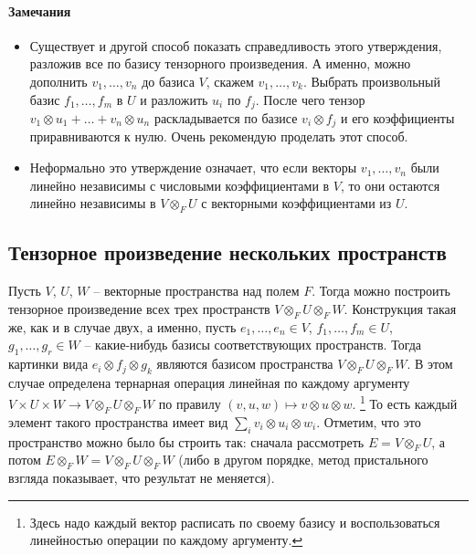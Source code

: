 \paragraph{Замечания}

\begin{itemize}
\item Существует и другой способ показать справедливость этого утверждения, разложив все по базису тензорного произведения.
А именно, можно дополнить $v_1,\ldots,v_n$ до базиса $V$, скажем $v_1,\ldots, v_k$.
Выбрать произвольный базис $f_1,\ldots,f_m$ в $U$ и разложить $u_i$ по $f_j$.
После чего тензор $v_1\otimes u_1 + \ldots + v_n\otimes u_n$ раскладывается по базисе $v_i\otimes f_j$ и его коэффициенты приравниваются к нулю.
Очень рекомендую проделать этот способ.

\item Неформально это утверждение означает, что если векторы $v_1,\ldots,v_n$ были линейно независимы с числовыми коэффициентами в $V$, то они остаются линейно независимы в $V\otimes_F U$ с векторными коэффициентами из $U$.
\end{itemize}


\subsection*{Тензорное произведение нескольких пространств}

Пусть $V$, $U$, $W$ -- векторные пространства над полем $F$.
Тогда можно построить тензорное произведение всех трех пространств $V\otimes_F U\otimes_F W$.
Конструкция такая же, как и в случае двух, а именно, пусть $e_1,\ldots,e_n\in V$, $f_1,\ldots,f_m\in U$, $g_1,\ldots, g_r\in W$ -- какие-нибудь базисы соответствующих пространств.
Тогда картинки вида $e_i\otimes f_j\otimes g_k$ являются базисом пространства $V\otimes_F U\otimes_F W$.
В этом случае определена тернарная операция линейная по каждому аргументу $V\times U\times W\to V\otimes_F U\otimes_F W$ по правилу $(v, u, w)\mapsto v\otimes u\otimes w$.%
\footnote{Здесь надо каждый вектор расписать по своему базису и воспользоваться линейностью операции по каждому аргументу.}
То есть каждый элемент такого пространства имеет вид $\sum_i v_i\otimes u_i\otimes w_i$.
Отметим, что это пространство можно было бы строить так: сначала рассмотреть $E = V\otimes_F U$, а потом $E\otimes_F W = V\otimes_F U \otimes_F W$ (либо в другом порядке, метод пристального взгляда показывает, что результат не меняется).

